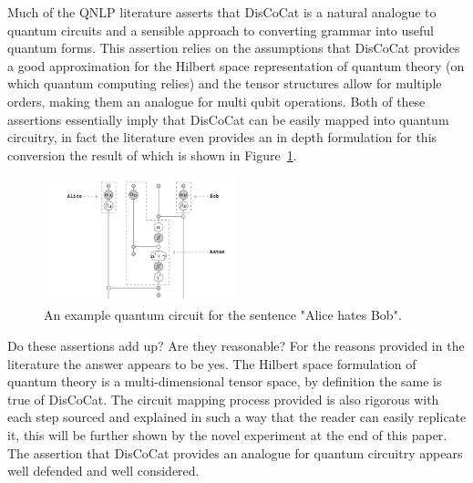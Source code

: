 \documentclass[a4paper,twocolumn,11pt]{quantumarticle}
\begin{document}
    Much of the QNLP literature asserts that DisCoCat is a natural analogue to quantum circuits and a sensible
    approach to converting grammar into useful quantum forms\cite{qnlp_in_prac, qnlp_near_term}.
    This assertion relies on the assumptions that DisCoCat provides a good approximation for the Hilbert
    space representation of quantum theory (on which quantum computing relies) and the tensor structures allow for
    multiple orders, making them an analogue for multi qubit operations.
    Both of these assertions essentially imply that DisCoCat can be easily mapped into quantum circuitry, in fact the
    literature even provides an in depth formulation for this conversion\cite{qnlp_near_term} the result of which is shown in
    Figure~\ref{fig:quantum-circuit}.
    \begin{figure}[h]
        \centering
        \includegraphics[width=0.5\textwidth]{quantum-circuit}
        \caption{An example quantum circuit for the sentence "Alice hates Bob"\cite{qubits_speak}.}
        \label{fig:quantum-circuit}
    \end{figure}
    Do these assertions add up?
    Are they reasonable?
    For the reasons provided in the literature the answer appears to be yes.
    The Hilbert space formulation of quantum theory is a multi-dimensional tensor
    space, by definition the same is true of DisCoCat\cite{discocat}.
    The circuit mapping process provided is also rigorous\cite{qnlp_near_term} with each step sourced and explained in
    such a way that the reader can easily replicate it, this will be further shown by the novel experiment at the end
    of this paper.
    The assertion that DisCoCat provides an analogue for quantum circuitry appears well defended and well considered.
\end{document}
